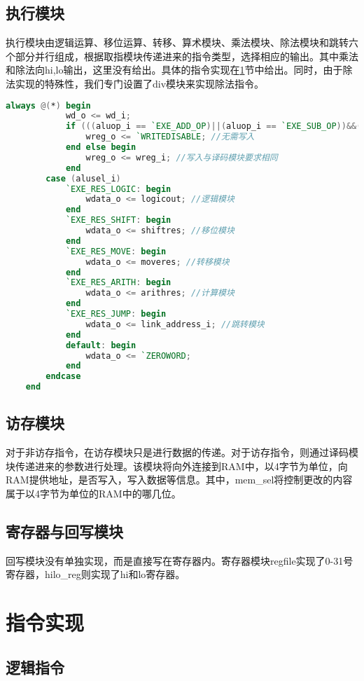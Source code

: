     \subsection{执行模块}
    执行模块由逻辑运算、移位运算、转移、算术模块、乘法模块、除法模块和跳转六个部分并行组成，根据取指模块传递进来的指令类型，选择相应的输出。其中乘法和除法向hi,lo输出，这里没有给出。具体的指令实现在\ref{sec:zlsx}节中给出。同时，由于除法实现的特殊性，我们专门设置了div模块来实现除法指令。
    \begin{lstlisting}[language=Verilog]
        always @(*) begin 
            wd_o <= wd_i;
		    if (((aluop_i == `EXE_ADD_OP)||(aluop_i == `EXE_SUB_OP))&&(overflow)  ) begin
			    wreg_o <= `WRITEDISABLE; //无需写入
		    end else begin
				wreg_o <= wreg_i; //写入与译码模块要求相同
		    end
        case (alusel_i)
            `EXE_RES_LOGIC: begin 
                wdata_o <= logicout; //逻辑模块
            end
            `EXE_RES_SHIFT: begin
                wdata_o <= shiftres; //移位模块
            end
            `EXE_RES_MOVE: begin
                wdata_o <= moveres; //转移模块
            end
            `EXE_RES_ARITH: begin
                wdata_o <= arithres; //计算模块
            end
            `EXE_RES_JUMP: begin
                wdata_o <= link_address_i; //跳转模块
            end
            default: begin
                wdata_o <= `ZEROWORD;
            end
        endcase
    end 
    \end{lstlisting}
    \subsection{访存模块}
        对于非访存指令，在访存模块只是进行数据的传递。对于访存指令，则通过译码模块传递进来的参数进行处理。该模块将向外连接到RAM中，以4字节为单位，向RAM提供地址，是否写入，写入数据等信息。其中，mem\_sel将控制更改的内容属于以4字节为单位的RAM中的哪几位。
    \subsection{寄存器与回写模块}
        回写模块没有单独实现，而是直接写在寄存器内。寄存器模块regfile实现了0-31号寄存器，hilo\_reg则实现了hi和lo寄存器。
    
\section{指令实现} \label{sec:zlsx}
\subsection{逻辑指令}
